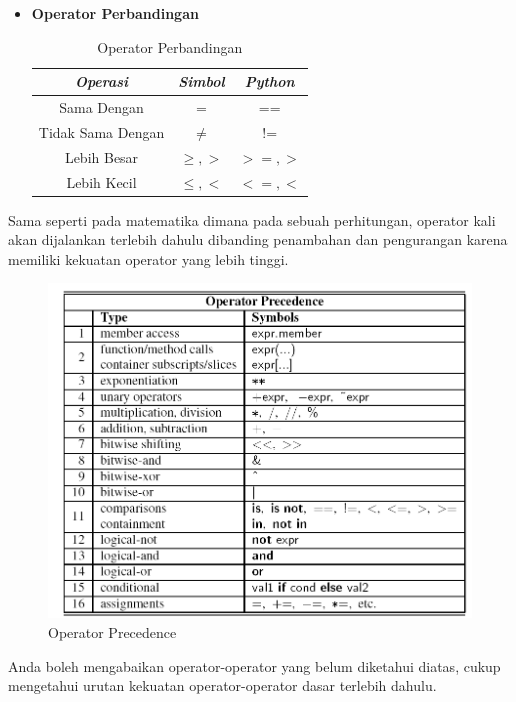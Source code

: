 \begin{itemize}
\FloatBarrier	
	\item \textbf{Operator Perbandingan}
			\large
			\begin{table}
				\centering
				\begin{tabular}[h!]{| c | c | c |}
				\hline	
				\textit{Operasi} & \textit{Simbol} & \textit{Python} \\ \hline
				Sama Dengan & $=$ & == \\ \hline
				Tidak Sama Dengan & $\neq$ & != \\ \hline
				Lebih Besar & $\geq,>$ & $>=,>$ \\ \hline
				Lebih Kecil & $\leq,<$ & $<=,<$ \\
				\hline
				\end{tabular}
				\caption{Operator Perbandingan}
				\label{tbl:operatorPerbandingan}
		\end{table}
\end{itemize}

\FloatBarrier

Sama seperti pada matematika dimana pada sebuah perhitungan, operator kali akan dijalankan terlebih dahulu dibanding penambahan dan pengurangan karena memiliki kekuatan operator yang lebih tinggi. 
	\begin{figure}
	\includegraphics[scale=0.50]{fig/1/Gambar21.png}
	\caption{Operator Precedence}
	\label{fig:operatorPrecedence}
	\end{figure}	
Anda boleh mengabaikan operator-operator yang belum diketahui diatas, cukup mengetahui urutan kekuatan operator-operator dasar terlebih dahulu.	

